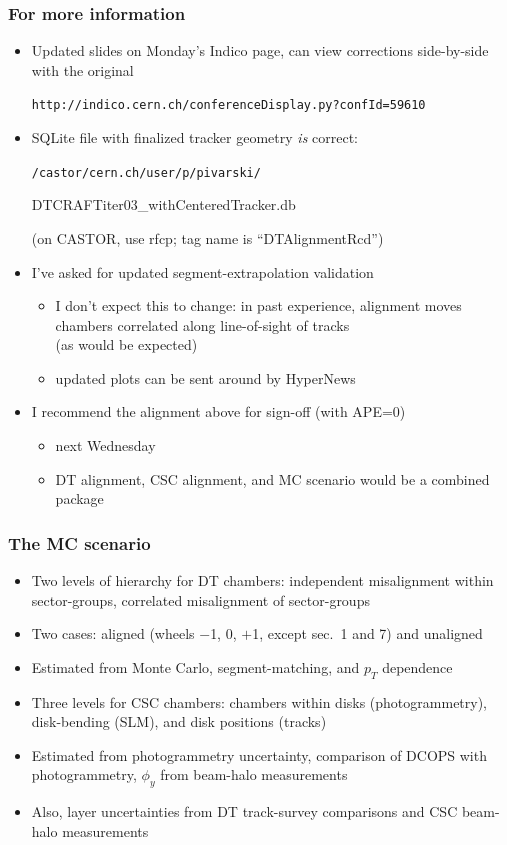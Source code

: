 \documentclass[compress]{beamer}
\begin{document}
\begin{frame}
\frametitle{For more information}
\begin{itemize}\setlength{\itemsep}{0.25 cm}
\item Updated slides on Monday's Indico page, can view corrections side-by-side with the original

{\tt http://indico.cern.ch/conferenceDisplay.py?confId=59610}

\item SQLite file with finalized tracker geometry {\it is} correct:

{\tt /castor/cern.ch/user/p/pivarski/

\hfill DTCRAFTiter03\_withCenteredTracker.db}

{\scriptsize (on CASTOR, use rfcp; tag name is ``DTAlignmentRcd'')}

\item I've asked for updated segment-extrapolation validation
\begin{itemize}
\item I don't expect this to change: in past experience, alignment moves
  chambers correlated along line-of-sight of tracks \\ (as would be
  expected)
\item updated plots can be sent around by HyperNews
\end{itemize}

\item I recommend the alignment above for sign-off (with APE=0)
\begin{itemize}
\item next Wednesday
\item DT alignment, CSC alignment, and MC scenario would be a combined package
\end{itemize}
\end{itemize}
\end{frame}

\begin{frame}
\frametitle{The MC scenario}
\begin{itemize}\setlength{\itemsep}{0.2 cm}
\item Two levels of hierarchy for DT chambers: independent
  misalignment within sector-groups, correlated misalignment of
  sector-groups
\item Two cases: aligned {\scriptsize (wheels $-$1, 0, $+$1, except sec.~1 and 7)} and unaligned
\item Estimated from Monte Carlo, segment-matching, and $p_T$ dependence
\item Three levels for CSC chambers: chambers within disks
  (photogrammetry), disk-bending (SLM), and disk
  positions (tracks)
\item Estimated from photogrammetry uncertainty, comparison of DCOPS
  with photogrammetry, $\phi_y$ from beam-halo measurements
\item Also, layer uncertainties from DT track-survey comparisons and
  CSC beam-halo measurements
\end{itemize}
\end{frame}
\end{document}

